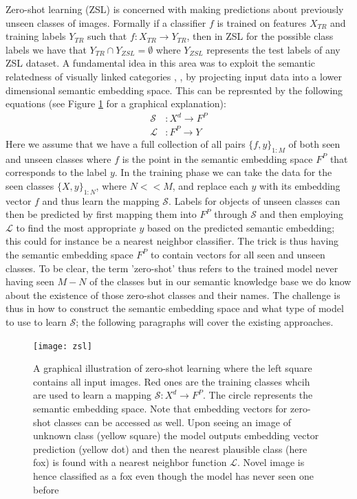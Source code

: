 \documentclass[12pt]{report}
\begin{document}
Zero-shot learning (ZSL) \cite{Palatucci2009} is concerned with making predictions about previously unseen classes of images. Formally if a classifier $f$ is trained on features $X_{TR}$ and training labels $Y_{TR}$ such that $f:X_{TR} \rightarrow Y_{TR}$, then in ZSL for the possible class labels we have that $Y_{TR} \cap Y_{ZSL} = \emptyset$ where $Y_{ZSL}$ represents the test labels of any ZSL dataset. A fundamental idea in this area was to exploit the semantic relatedness of visually linked categories \cite{Monay2004}, \cite{Weston2010}, \cite{Palatucci2009} by projecting input data into a lower dimensional semantic embedding space. This can be represnted by the following equations \cite{Palatucci2009} (see Figure \ref{fig:zsl} for a graphical explanation):
\begin{align} \label{zsl_eq}
  \mathcal{S} &: X^d \rightarrow F^P \\
  \mathcal{L} &: F^P \rightarrow Y
\end{align}
Here we assume that we have a full collection of all pairs $\{f, y\}_{1:M}$ of both seen and unseen classes where $f$ is the point in the semantic embedding space $F^P$ that corresponds to the label $y$. In the training phase we can take the data for the seen classes $\{X, y\}_{1:N}$, where $N<<M$, and replace each $y$ with its embedding vector $f$ and thus learn the mapping $\mathcal{S}$. Labels for objects of unseen classes can then be predicted by first mapping them into $F^P$ through $\mathcal{S}$ and then employing $\mathcal{L}$ to find the most appropriate $y$ based on the predicted semantic embedding; this could for instance be a nearest neighbor classifier. The trick is thus having the semantic embedding space $F^P$ to contain vectors for all seen and unseen classes. To be clear, the term 'zero-shot' thus refers to the trained model never having seen $M-N$ of the classes but in our semantic knowledge base we do know about the existence of those zero-shot classes and their names. The challenge is thus in how to construct the semantic embedding space and what type of model to use to learn $\mathcal{S}$; the following paragraphs will cover the existing approaches.

\begin{figure}
  \centering
	\texttt{[image: zsl]}
	\caption{A graphical illustration of zero-shot learning where the left square contains all input images. Red ones are the training classes whcih are used to learn a mapping $\mathcal{S}:X^d \rightarrow F^P$. The circle represents the semantic embedding space. Note that embedding vectors for zero-shot classes can be accessed as well. Upon seeing an image of unknown class (yellow square) the model outputs embedding vector prediction (yellow dot) and then the nearest plausible class (here fox) is found with a nearest neighbor function $\mathcal{L}$. Novel image is hence classified as a fox even though the model has never seen one before}
	\label{fig:zsl}
\end{figure}
\end{document}
